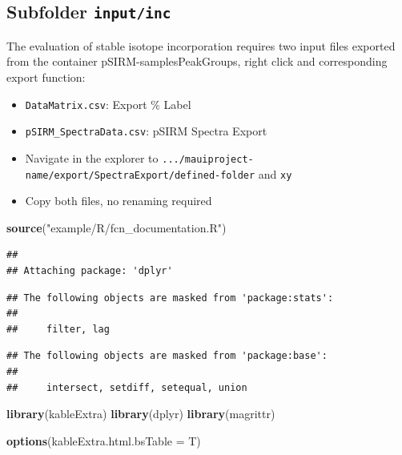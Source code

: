 \documentclass[]{book}
\newenvironment{Shaded}{\begin{snugshade}}{\end{snugshade}}
\newcommand{\KeywordTok}[1]{\textcolor[rgb]{0.13,0.29,0.53}{\textbf{#1}}}
\newcommand{\DataTypeTok}[1]{\textcolor[rgb]{0.13,0.29,0.53}{#1}}
\newcommand{\StringTok}[1]{\textcolor[rgb]{0.31,0.60,0.02}{#1}}
\newcommand{\NormalTok}[1]{#1}
\providecommand{\tightlist}{%
  \setlength{\itemsep}{0pt}\setlength{\parskip}{0pt}}
\theoremstyle{definition}
\theoremstyle{definition}
\theoremstyle{definition}
\theoremstyle{remark}
\begin{document}
\subsection{\texorpdfstring{Subfolder
\texttt{input/inc}}{Subfolder input/inc}}\label{subfolder-inputinc}

The evaluation of stable isotope incorporation requires two input files
exported from the container pSIRM-samplesPeakGroups, right click and
corresponding export function:

\begin{itemize}
\tightlist
\item
  \texttt{DataMatrix.csv}: Export \% Label
\item
  \texttt{pSIRM\_SpectraData.csv}: pSIRM Spectra Export
\item
  Navigate in the explorer to
  \texttt{.../mauiproject-name/export/SpectraExport/defined-folder} and
  \texttt{xy}
\item
  Copy both files, no renaming required
\end{itemize}

\begin{Shaded}
\begin{Highlighting}[]
\KeywordTok{source}\NormalTok{(}\StringTok{"example/R/fcn_documentation.R"}\NormalTok{)}
\end{Highlighting}
\end{Shaded}

\begin{verbatim}
## 
## Attaching package: 'dplyr'
\end{verbatim}

\begin{verbatim}
## The following objects are masked from 'package:stats':
## 
##     filter, lag
\end{verbatim}

\begin{verbatim}
## The following objects are masked from 'package:base':
## 
##     intersect, setdiff, setequal, union
\end{verbatim}

\begin{Shaded}
\begin{Highlighting}[]
\KeywordTok{library}\NormalTok{(kableExtra)}
\KeywordTok{library}\NormalTok{(dplyr)}
\KeywordTok{library}\NormalTok{(magrittr)}

\KeywordTok{options}\NormalTok{(}\DataTypeTok{kableExtra.html.bsTable =}\NormalTok{ T)}
\end{Highlighting}
\end{Shaded}
\end{document}
